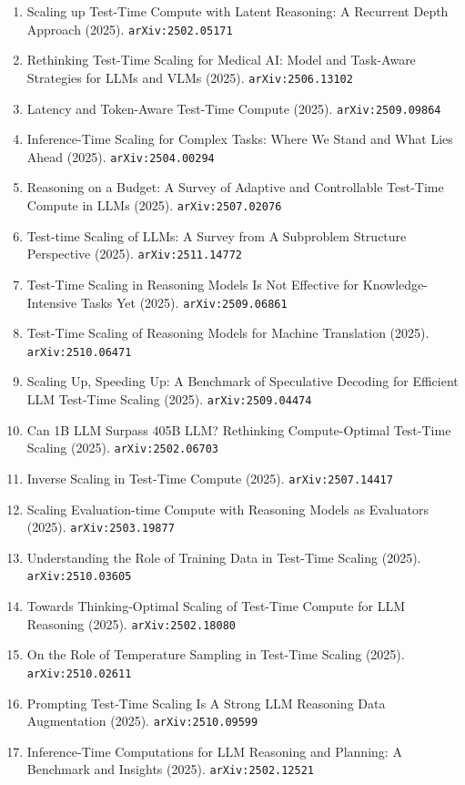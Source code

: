 \documentclass[11pt]{article}
\begin{document}
\begin{enumerate}
  \item Scaling up Test-Time Compute with Latent Reasoning: A Recurrent Depth
  Approach (2025). \texttt{arXiv:2502.05171}
  \item Rethinking Test-Time Scaling for Medical AI: Model and Task-Aware Strategies for LLMs and VLMs (2025). \texttt{arXiv:2506.13102}
  \item Latency and Token-Aware Test-Time Compute (2025). \texttt{arXiv:2509.09864}
  \item Inference-Time Scaling for Complex Tasks: Where We Stand and What Lies
  Ahead (2025). \texttt{arXiv:2504.00294}
  \item Reasoning on a Budget: A Survey of Adaptive and Controllable Test-Time Compute in LLMs (2025). \texttt{arXiv:2507.02076}
  \item Test-time Scaling of LLMs: A Survey from A Subproblem Structure Perspective (2025). \texttt{arXiv:2511.14772}
  \item Test-Time Scaling in Reasoning Models Is Not Effective for Knowledge-Intensive Tasks Yet (2025). \texttt{arXiv:2509.06861}
  \item Test-Time Scaling of Reasoning Models for Machine Translation (2025). \texttt{arXiv:2510.06471}
  \item Scaling Up, Speeding Up: A Benchmark of Speculative Decoding for Efficient LLM Test-Time Scaling (2025). \texttt{arXiv:2509.04474}
  \item Can 1B LLM Surpass 405B LLM? Rethinking Compute-Optimal Test-Time
  Scaling (2025). \texttt{arXiv:2502.06703}
  \item Inverse Scaling in Test-Time Compute (2025). \texttt{arXiv:2507.14417}
  \item Scaling Evaluation-time Compute with Reasoning Models as Evaluators (2025). \texttt{arXiv:2503.19877}
  \item Understanding the Role of Training Data in Test-Time Scaling (2025). \texttt{arXiv:2510.03605}
  \item Towards Thinking-Optimal Scaling of Test-Time Compute for LLM Reasoning (2025). \texttt{arXiv:2502.18080}
  \item On the Role of Temperature Sampling in Test-Time Scaling (2025). \texttt{arXiv:2510.02611}
  \item Prompting Test-Time Scaling Is A Strong LLM Reasoning Data Augmentation (2025). \texttt{arXiv:2510.09599}
  \item Inference-Time Computations for LLM Reasoning and Planning: A Benchmark
  and Insights (2025). \texttt{arXiv:2502.12521}

\end{enumerate}
\end{document}
